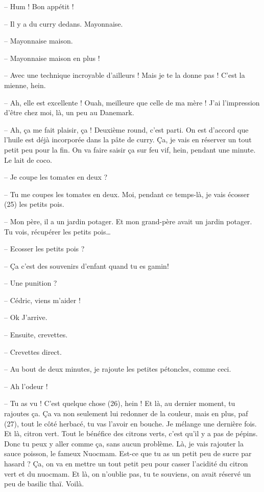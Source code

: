\documentclass[11pt, french]{report}
\begin{document}
-- Hum ! Bon appétit !

-- Il y a du curry dedans. Mayonnaise.

-- Mayonnaise maison.

-- Mayonnaise maison en plus !

-- Avec une technique incroyable d’ailleurs ! Mais je te la donne pas ! C’est la
mienne, hein.

-- Ah, elle est excellente ! Ouah, meilleure que celle de ma mère ! J’ai
l’impression d’être chez moi, là, un peu au Danemark.

-- Ah, ça me fait plaisir, ça ! Deuxième round, c’est parti. On est d’accord que
l’huile est déjà incorporée dans la pâte de curry. Ça, je vais en réserver un tout
petit peu pour la fin. On va faire saisir ça sur feu vif, hein, pendant une minute.
Le lait de coco.

-- Je coupe les tomates en deux ?

-- Tu me coupes les tomates en deux. Moi, pendant ce temps-là, je vais écosser (25)
les petits pois.

-- Mon père, il a un jardin potager. Et mon grand-père avait un jardin potager. Tu
vois, récupérer les petits pois…

-- Ecosser les petits pois ?

-- Ça c’est des souvenirs d’enfant quand tu es gamin!

-- Une punition ?

-- Cédric, viens m’aider !

-- Ok J’arrive.

-- Ensuite, crevettes.

-- Crevettes direct.

-- Au bout de deux minutes, je rajoute les petites pétoncles, comme ceci.

-- Ah l’odeur !

-- Tu as vu ! C’est quelque chose (26), hein ! Et là, au dernier moment, tu
rajoutes ça. Ça va non seulement lui redonner de la couleur, mais en plus,
paf (27), tout le côté herbacé, tu vas l’avoir en bouche. Je mélange une dernière
fois. Et là, citron vert. Tout le bénéfice des citrons verts, c’est qu’il y a pas
de pépins. Donc tu peux y aller comme ça, sans aucun problème. Là, je vais
rajouter la sauce poisson, le fameux Nuocmam. Est-ce que tu as un petit peu de
sucre par hasard ? Ça, on va en mettre un tout petit peu pour casser l’acidité du
citron vert et du nuocmam. Et là, on n’oublie pas, tu te souviens, on avait
réservé un peu de basilic thaï. Voilà.
\end{document}
